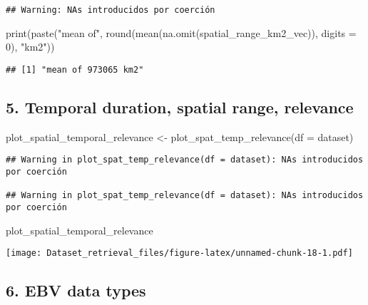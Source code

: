\documentclass[
]{article}
\newenvironment{Shaded}{\begin{snugshade}}{\end{snugshade}}
\newcommand{\AttributeTok}[1]{\textcolor[rgb]{0.77,0.63,0.00}{#1}}
\newcommand{\DecValTok}[1]{\textcolor[rgb]{0.00,0.00,0.81}{#1}}
\newcommand{\FunctionTok}[1]{\textcolor[rgb]{0.00,0.00,0.00}{#1}}
\newcommand{\NormalTok}[1]{#1}
\newcommand{\OtherTok}[1]{\textcolor[rgb]{0.56,0.35,0.01}{#1}}
\newcommand{\StringTok}[1]{\textcolor[rgb]{0.31,0.60,0.02}{#1}}
\begin{document}
\begin{verbatim}
## Warning: NAs introducidos por coerción
\end{verbatim}

\begin{Shaded}
\begin{Highlighting}[]
\FunctionTok{print}\NormalTok{(}\FunctionTok{paste}\NormalTok{(}\StringTok{"mean of"}\NormalTok{,}
            \FunctionTok{round}\NormalTok{(}\FunctionTok{mean}\NormalTok{(}\FunctionTok{na.omit}\NormalTok{(spatial\_range\_km2\_vec)), }\AttributeTok{digits =} \DecValTok{0}\NormalTok{),}
            \StringTok{"km2"}\NormalTok{))}
\end{Highlighting}
\end{Shaded}

\begin{verbatim}
## [1] "mean of 973065 km2"
\end{verbatim}

\hypertarget{temporal-duration-spatial-range-relevance}{%
\subsection{5. Temporal duration, spatial range,
relevance}\label{temporal-duration-spatial-range-relevance}}

\begin{Shaded}
\begin{Highlighting}[]
\NormalTok{plot\_spatial\_temporal\_relevance }\OtherTok{\textless{}{-}} \FunctionTok{plot\_spat\_temp\_relevance}\NormalTok{(}\AttributeTok{df =}\NormalTok{ dataset)}
\end{Highlighting}
\end{Shaded}

\begin{verbatim}
## Warning in plot_spat_temp_relevance(df = dataset): NAs introducidos por coerción

## Warning in plot_spat_temp_relevance(df = dataset): NAs introducidos por coerción
\end{verbatim}

\begin{Shaded}
\begin{Highlighting}[]
\NormalTok{plot\_spatial\_temporal\_relevance}
\end{Highlighting}
\end{Shaded}

\texttt{[image: Dataset\_retrieval\_files/figure-latex/unnamed-chunk-18-1.pdf]}

\hypertarget{ebv-data-types}{%
\subsection{6. EBV data types}\label{ebv-data-types}}
\end{document}
